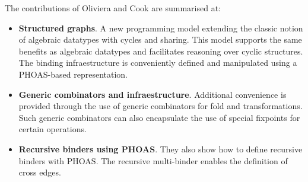 
The contributions of Oliviera and Cook are summarised at:

\begin{itemize}
  \item \textbf{Structured graphs}. A new programming model extending the classic notion of algebraic datatypes with cycles and sharing. This model supports the same benefits as algebraic datatypes and facilitates reasoning over cyclic structures. The binding infraestructure is conveniently defined and manipulated using a PHOAS-based representation.
  \item \textbf{Generic combinators and infraestructure}. Additional convenience is provided through the use of generic combinators for fold and transformations. Such generic combinators can also encapsulate the use of special fixpoints for certain operations.
  \item \textbf{Recursive binders using PHOAS}. They also show how to define recursive binders with PHOAS. The recursive multi-binder enables the definition of cross edges.
\end{itemize}
